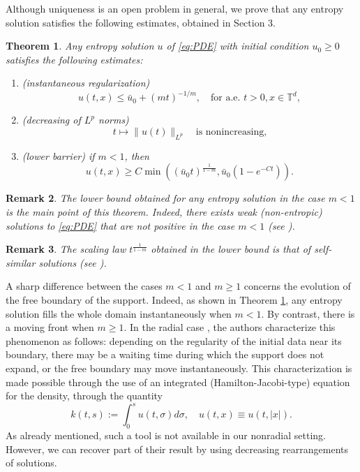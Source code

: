 \documentclass[11pt]{article}
\newtheorem{thm}{Theorem}[section]
\newtheorem{remark}[thm]{Remark}
\numberwithin{equation}{section} %
\newcommand{\T}{{\mathbb{T}}}
\begin{document}
Although uniqueness is an open problem in general, we prove that any entropy solution satisfies the following estimates, obtained in Section 3.
\begin{thm}\label{thm:entropysolnproperties}
    Any entropy solution $u$ of \eqref{eq:PDE} with initial condition $u_0 \ge 0$ satisfies the following estimates:
    \begin{enumerate}
        \item (instantaneous regularization) 
        \begin{equation*}
            u(t,x) \le \bar u_0 + (mt)^{-1/m}, \quad \text{for a.e. } t>0, x\in \T^d,
        \end{equation*}
        \item (decreasing of $L^p$ norms)
        \begin{equation*}
            t\mapsto \| u(t)\|_{L^p} \quad \text{is nonincreasing,}
        \end{equation*}
        \item (lower barrier) if $m<1$, then
        \begin{equation*}
            u(t,x) \ge C\min ( (\bar u_0 t)^\frac{1}{1-m}, \bar u_0 (1- e^{-C t})).
        \end{equation*}
    \end{enumerate}
\end{thm}
\begin{remark}
    The lower bound obtained for any entropy solution in the case $m<1$ is the main point of this theorem. Indeed, there exists weak (non-entropic) solutions to \eqref{eq:PDE} that are not positive in the case $m<1$ (see \cite{CGV22FastRegularisation}).
\end{remark}
\begin{remark}
    The scaling law $t^\frac{1}{1-m}$ obtained in the lower bound is that of self-similar solutions (see \cite{CGV22FastRegularisation}).  
\end{remark}

A sharp difference between the cases $m<1$ and $m\ge 1$ concerns the evolution of the free boundary of the support. Indeed, as shown in Theorem \ref{thm:entropysolnproperties}, any entropy solution fills the whole domain instantaneously when $m<1$. By contrast, there is a moving front when $m\ge 1$. In the radial case \cite{CGV2022vortex}, the authors characterize this phenomenon as follows: depending on the regularity of the initial data near its boundary, there may be a waiting time during which the support does not expand, or the free boundary may move instantaneously. This characterization is made possible through the use of an integrated (Hamilton-Jacobi-type) equation for the density, through the quantity
\begin{equation*}
    k(t,s ) := \int_0^s u(t,\sigma)d\sigma, \quad u(t,x) \equiv u(t,|x|).
\end{equation*}
As already mentioned, such a tool is not available in our nonradial setting. However, we can recover part of their result by using decreasing rearrangements of solutions. 
\end{document}
